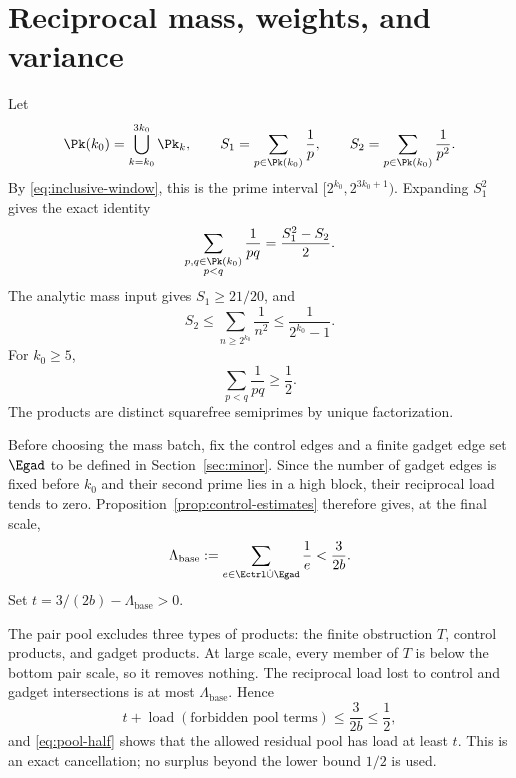 \section{Reciprocal mass, weights, and variance}\label{sec:mass}

Let
\[
 \Pk(k_0)=\bigcup_{k=k_0}^{3k_0}\Pk_k,
 \qquad
 S_1=\sum_{p\in\Pk(k_0)}\frac1p,
 \qquad
 S_2=\sum_{p\in\Pk(k_0)}\frac1{p^2}.
\]
By \eqref{eq:inclusive-window}, this is the prime interval
$[2^{k_0},2^{3k_0+1})$.  Expanding $S_1^2$ gives the exact identity
\begin{equation}\label{eq:pair-pool}
 \sum_{\substack{p,q\in\Pk(k_0)\\p<q}}\frac1{pq}
 =\frac{S_1^2-S_2}{2}.
\end{equation}
The analytic mass input gives $S_1\ge21/20$, and
\[
 S_2\le\sum_{n\ge2^{k_0}}\frac1{n^2}
 \le\frac1{2^{k_0}-1}.
\]
For $k_0\ge5$,
\begin{equation}\label{eq:pool-half}
 \sum_{p<q}\frac1{pq}\ge\frac12.
\end{equation}
The products are distinct squarefree semiprimes by unique factorization.

Before choosing the mass batch, fix the control edges and a finite gadget edge
set $\Egad$ to be defined in Section~\ref{sec:minor}.  Since the number of
gadget edges is fixed before $k_0$ and their second prime lies in a high block,
their reciprocal load tends to zero.  Proposition~\ref{prop:control-estimates}
therefore gives, at the final scale,
\begin{equation}\label{eq:base-load}
 \Lambda_{\mathrm{base}}:=
 \sum_{e\in\Ectrl\dot\cup\Egad}\frac1e
 <\frac{3}{2b}.
\end{equation}
Set $t=3/(2b)-\Lambda_{\mathrm{base}}>0$.

The pair pool excludes three types of products: the finite obstruction $T$,
control products, and gadget products.  At large scale, every member of $T$ is
below the bottom pair scale, so it removes nothing.  The reciprocal load lost
to control and gadget intersections is at most
$\Lambda_{\mathrm{base}}$.  Hence
\[
 t+\operatorname{load}(\text{forbidden pool terms})
 \le\frac{3}{2b}\le\frac12,
\]
and \eqref{eq:pool-half} shows that the allowed residual pool has load at least
$t$.  This is an exact cancellation; no surplus beyond the lower bound $1/2$
is used.

